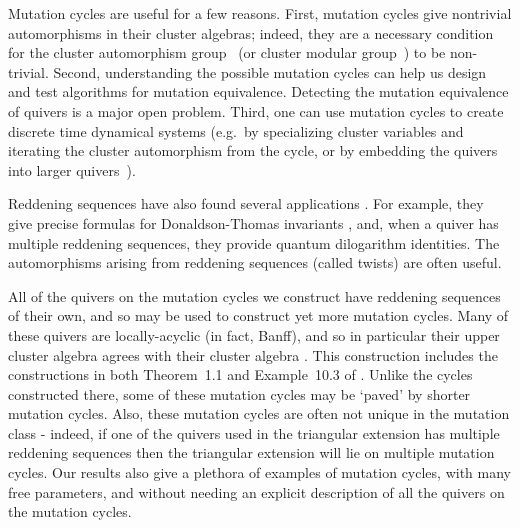 \documentclass[11pt, letterpaper]{amsart}
\theoremstyle{definition}
\numberwithin{equation}{section}
\begin{document}
Mutation cycles are useful for a few reasons. %
First, mutation cycles give nontrivial automorphisms in their cluster algebras; indeed, they are a necessary condition for the cluster automorphism group~\cite{AssemShifflerShramchenkoClusterAuts} (or cluster modular group~\cite{FockGoncharovEnsembles}) to be non-trivial.
Second, understanding the possible mutation cycles can help us design and test algorithms for mutation equivalence. %
Detecting the mutation equivalence of quivers is a major open problem. 
Third, one can use mutation cycles to create discrete time dynamical systems (e.g.\ by specializing cluster variables and iterating the cluster automorphism from the cycle, or by embedding the quivers into larger quivers~\cite{MachacekOvenhouseDynamicalMutation}).

Reddening sequences have also found several applications \cite{KellerGreenSurvey}.
For example, they give precise formulas for Donaldson-Thomas invariants \cite{kellerDT, KontsevichSoibelmanDT}, and, when a quiver has multiple reddening sequences, they provide quantum dilogarithm identities.
The automorphisms arising from reddening sequences (called twists) are often useful.



All of the quivers on the mutation cycles we construct have reddening sequences of their own, and so may be used to construct yet more mutation cycles. 
Many of these quivers are locally-acyclic (in fact, Banff), and so in particular their upper cluster algebra agrees with their cluster algebra \cite{muller_locally_2013}.
This construction includes the constructions in both Theorem~1.1 and Example~10.3 of \cite{LMC}. 
Unlike the cycles constructed there, some of these mutation cycles may be `paved' by shorter mutation cycles.
Also, these mutation cycles are often not unique in the mutation class - indeed, if one of the quivers used in the triangular extension has multiple reddening sequences then the triangular extension will lie on multiple mutation cycles.
Our results also give a plethora of examples of mutation cycles, with many free parameters, and without needing an explicit description of all the quivers on the mutation cycles.
\end{document}
